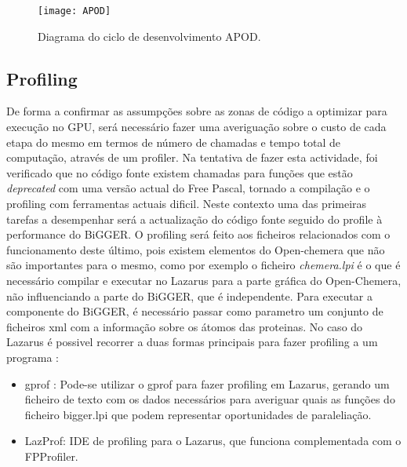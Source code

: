      \begin{figure}[ht]
  \centering
    {\texttt{[image: APOD]}}
  \caption{ Diagrama do ciclo de desenvolvimento APOD\cite{cudaProgGuide}.}
  \label{apodFig}
\end{figure}

\subsection {Profiling}
\label{profiling}
De forma a confirmar as assumpções sobre as zonas de código a optimizar para execução no GPU, será necessário fazer uma averiguação sobre o custo de cada etapa do mesmo em termos de número de chamadas e tempo total de computação, através de um profiler. Na tentativa de fazer esta actividade, foi verificado que no código fonte existem chamadas para funções que estão \textit{deprecated} com uma versão actual do Free Pascal, tornado a compilação e o profiling com ferramentas actuais dificil. Neste contexto uma das primeiras tarefas a desempenhar será a actualização do código fonte seguido do profile à performance do BiGGER. O profiling será feito aos ficheiros relacionados com o funcionamento deste último, pois existem elementos do Open-chemera que não são importantes para o mesmo, como por exemplo o ficheiro \textit{chemera.lpi} é o que é necessário compilar e executar no Lazarus para a parte gráfica do Open-Chemera, não influenciando a parte do BiGGER, que é independente. Para executar a componente do BiGGER, é necessário passar como parametro um conjunto de ficheiros xml com a informação sobre os átomos das proteinas.  No caso do Lazarus é possivel recorrer a duas formas principais para fazer profiling a um programa \cite{lazProf}:
\begin{itemize}
\item gprof : Pode-se utilizar o gprof para fazer profiling em Lazarus, gerando um ficheiro de texto com os dados necessários para averiguar quais as funções do ficheiro bigger.lpi que podem representar oportunidades de paraleliação. 
\item LazProf: IDE de profiling para o Lazarus, que funciona complementada com o FPProfiler. 
\end{itemize}  

